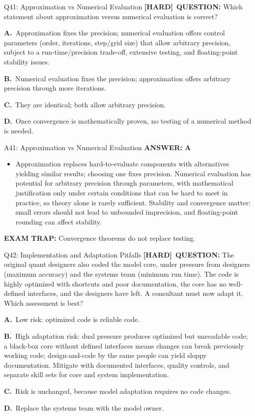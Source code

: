 \documentclass[8pt]{beamer}
\newcommand{\fs}{\fontsize{10}{12}\selectfont}
\newcommand{\opts}[4]{\par\vspace{0.12cm}\noindent\textbf{A.}~#1\par\vspace{0.08cm}\noindent\textbf{B.}~#2\par\vspace{0.08cm}\noindent\textbf{C.}~#3\par\vspace{0.08cm}\noindent\textbf{D.}~#4\par}
\newcommand{\ans}[1]{\textcolor{myblue}{\textbf{ANSWER: #1}}}
\newcommand{\trap}[1]{\textcolor{myred}{\textbf{EXAM TRAP:}} #1}
\newcommand{\hard}{\textcolor{myorange}{\textbf{[HARD]}}}
\begin{document}
\begin{frame}[t]{Q41: Approximation vs Numerical Evaluation}
\fs
\hard\ \textbf{QUESTION:} Which statement about approximation versus numerical evaluation is correct?
\opts{Approximation fixes the precision; numerical evaluation offers control parameters (order, iterations, step/grid size) that allow arbitrary precision, subject to a run-time/precision trade-off, extensive testing, and floating-point stability issues.}
{Numerical evaluation fixes the precision; approximation offers arbitrary precision through more iterations.}
{They are identical; both allow arbitrary precision.}
{Once convergence is mathematically proven, no testing of a numerical method is needed.}
\end{frame}

\begin{frame}[t]{A41: Approximation vs Numerical Evaluation}
\fs
\ans{A}
\begin{itemize}
\item Approximation replaces hard-to-evaluate components with alternatives yielding similar results; choosing one fixes precision. Numerical evaluation has potential for arbitrary precision through parameters, with mathematical justification only under certain conditions that can be hard to meet in practice, so theory alone is rarely sufficient. Stability and convergence matter: small errors should not lead to unbounded imprecision, and floating-point rounding can affect stability.
\end{itemize}
\trap{Convergence theorems \textcolor{myblue}{do not replace} testing.}
\end{frame}

\begin{frame}[t]{Q42: Implementation and Adaptation Pitfalls}
\fs
\hard\ \textbf{QUESTION:} The original quant designers also coded the model core, under pressure from designers (maximum accuracy) and the systems team (minimum run time). The code is highly optimized with shortcuts and poor documentation, the core has no well-defined interfaces, and the designers have left. A consultant must now adapt it. Which assessment is best?
\opts{Low risk: optimized code is reliable code.}
{High adaptation risk: dual pressure produces optimized but unreadable code; a black-box core without defined interfaces means changes can break previously working code; design-and-code by the same people can yield sloppy documentation. Mitigate with documented interfaces, quality controls, and separate skill sets for core and system implementation.}
{Risk is unchanged, because model adaptation requires no code changes.}
{Replace the systems team with the model owner.}
\end{frame}
\end{document}
